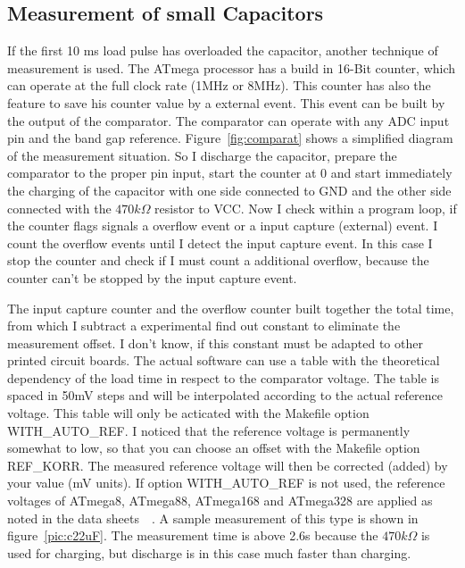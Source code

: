 \subsection{Measurement of small Capacitors}
If the first 10 ms load pulse has overloaded the capacitor, another technique of measurement is used.
The ATmega processor has a build in 16-Bit counter, which can operate at the full clock rate (1MHz or 8MHz).
This counter has also the feature to save his counter value by a external event.
This event can be built by the output of the comparator. 
The comparator can operate with any ADC input pin and the band gap reference.
Figure~\ref{fig:comparat} shows a simplified diagram of the measurement situation.
So I discharge the capacitor, prepare the comparator to the proper pin input, start the counter at 0 and
start immediately the charging of the capacitor with one side connected to GND and the other side connected with
the \(470k\Omega\) resistor to VCC.
Now I check within a program loop, if the counter flags signals a overflow event or a input capture (external) event.
I count the overflow events until I detect the input capture event.
In this case I stop the counter and check if I must count a additional overflow,
because the counter can't be stopped by the input capture event.


The input capture counter and the overflow counter built together the total time,
from which I subtract a experimental find out constant to eliminate the measurement offset. 
I don't know, if this constant must be adapted to other printed circuit boards.
The actual software can use a table with the theoretical  dependency of the load time in respect to the comparator voltage.
The table is spaced in 50mV steps and will be interpolated according to the actual reference voltage. 
This table will only be acticated with the Makefile option WITH\_AUTO\_REF.
I noticed that the reference voltage is permanently somewhat to low,
 so that you can choose an offset with the Makefile option REF\_KORR.
The measured reference voltage will then be corrected (added) by your value (mV units).
If option WITH\_AUTO\_REF is not used, the reference voltages of ATmega8, ATmega88, ATmega168 and ATmega328
are applied as noted in the data sheets~\cite{ATmega8}~\cite{ATmega168}. 
A sample measurement of this type is shown in figure~\ref{pic:c22uF}.
The measurement time is above 2.6s because the \(470k\Omega\) is
used for charging, but discharge is in this case much faster than charging.

